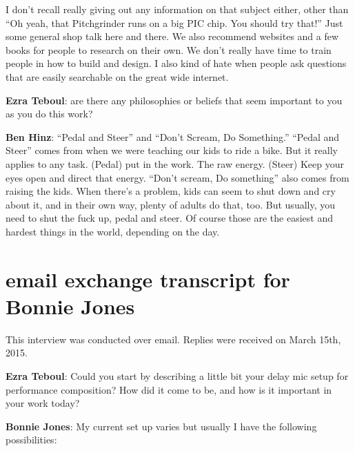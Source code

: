 I don't recall really giving out any information on that subject either, other 
than ``Oh yeah, that Pitchgrinder runs on a big PIC chip. You should try that!'' Just 
some general shop talk here and there. We also recommend websites and a few 
books for people to research on their own. We don’t really have time to train 
people in how to build and design. I also kind of hate when people ask questions 
that are easily searchable on the great wide internet.

\textbf{Ezra Teboul}: are there any philosophies or beliefs that seem important to you as
you do this work?

\textbf{Ben Hinz}: ``Pedal and Steer'' and ``Don't Scream, Do Something.''
``Pedal and Steer'' comes from when we were teaching our kids to ride a
bike. But it really applies to any task. (Pedal) put in the work. The
raw energy. (Steer) Keep your eyes open and direct that energy.
``Don't scream, Do something'' also comes from raising the kids. When
there's a problem, kids can seem to shut down and cry about it, and in
their own way, plenty of adults do that, too. But usually, you need to
shut the fuck up, pedal and steer. Of course those are the easiest and
hardest things in the world, depending on the day.

\newpage

\clearpage 
\section{email exchange transcript for Bonnie Jones}

This interview was conducted over email. Replies were received on March 15th, 2015. 

\textbf{Ezra Teboul}: Could you start by describing a little bit your delay \/ mic setup for performance \/ composition? How did it come to be, and how is it important in your work today?

\textbf{Bonnie Jones}: My current set up varies but usually I have the following possibilities: 

